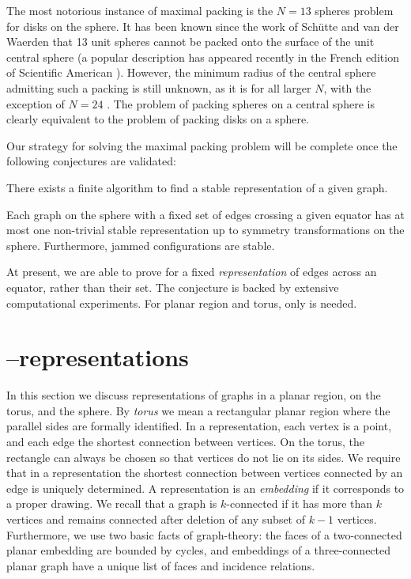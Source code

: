 \documentclass[invmat]{svjour}
\begin{document}
The most notorious instance of maximal packing is the $N=13$ spheres
problem for disks on the sphere. It has been known since the work of
Sch\"{u}tte and van der Waerden \cite{Schuette} that 13 unit spheres
cannot be packed onto the surface of the unit central sphere (a popular
description has appeared recently in the French edition of Scientific American
\cite{Berger}). However, the minimum radius of the central sphere
admitting such a packing is still unknown, as it is for all larger $N$,
with the exception of $N=24$ \cite{Robinson}.  The problem  of packing
spheres on a central sphere is clearly equivalent to the problem of
packing disks on a sphere.

Our strategy for solving the maximal packing problem will be complete
once the following conjectures are validated:
\begin{conjecture}
\label{c:algorithm}
There exists a finite algorithm to find a stable  representation of a
given graph.
\end{conjecture}
\begin{conjecture}
\label{c:sphere_unique}
Each graph on the sphere with a fixed set of edges crossing a given
equator has at most one non-trivial stable representation up to symmetry
transformations on the sphere.  Furthermore, jammed configurations
are stable.
\end{conjecture}
At present, we are able to prove  for a fixed
\emph{representation} of edges across an equator, rather than their
set. The conjecture is backed by extensive computational experiments.
For planar region and torus, only  is needed.

\section{\M--representations}
\label{s:M_representations}

In this section we discuss representations of graphs in a planar region,
on the torus, and the sphere. By \emph{torus} we mean a rectangular
planar region where the parallel sides are formally identified.  In a
representation, each vertex is a point, and each edge the shortest
connection between vertices. On the torus, the rectangle can always be
chosen so that vertices  do not lie on its sides.  We require that in a
representation the shortest connection between vertices connected by an
edge is uniquely determined. A representation is  an \emph{embedding}
if it corresponds to a proper drawing.  We recall that a graph is
$k$-connected if it has more than $k$ vertices and remains connected
after deletion of any subset of $k-1$ vertices.  Furthermore, we use
two basic facts of graph-theory: the faces of a two-connected planar
embedding are bounded by cycles, and embeddings of a three-connected
planar graph have a unique list of faces and incidence relations.
\end{document}
